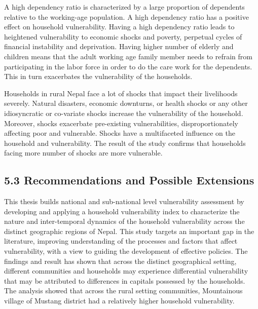 \documentclass[12pt, a4paper]{article}
\begin{document}
A high dependency ratio is characterized by a large proportion of dependents relative to the working-age population. A high dependency ratio has a positive effect on household vulnerability. Having a high dependency ratio leads to heightened vulnerability to economic shocks and poverty, perpetual cycles of financial instability and deprivation. Having higher number of elderly and children means that the adult working age family member needs to refrain from participating in the labor force in order to do the care work for the dependents. This in turn exacerbates the vulnerability of the households. 

Households in rural Nepal face a lot of shocks that impact their livelihoods severely. Natural disasters, economic downturns, or health shocks or any other idiosyncratic or co-variate shocks increase the vulnerability of the household. Moreover, shocks exacerbate pre-existing vulnerabilities, disproportionately affecting poor and vulnerable. Shocks have a multifaceted influence on the household and vulnerability. The result of the study confirms that households facing more number of shocks are more vulnerable. 

\subsection*{5.3 Recommendations and Possible Extensions}
\renewcommand{\thepage}{\arabic{page}}
This thesis builds national and sub-national level vulnerability assessment \cite{antwi2013characterising, aksha2019analysis, shahiestimating} by developing and applying a household vulnerability index to characterize the nature and inter-temporal dynamics of the household vulnerability across the distinct geographic regions of Nepal. This study targets an important gap in the literature, improving understanding of the processes and factors that affect vulnerability, with a view to guiding the development of effective policies. The findings and result has shown that across the distinct geographical setting, different communities and households may experience differential vulnerability that may be attributed to differences in capitals possessed by the households. The analysis showed that across the rural setting communities, Mountainous village of Mustang district had a relatively higher household vulnerability. 
\end{document}
